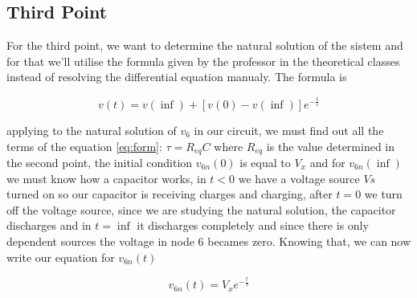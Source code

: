 \vspace{5mm}
\begin{table}[H]
\centering
\begin{tabularx}{0.6\textwidth} {
  | >{\raggedright\arraybackslash}X
  | >{\raggedleft\arraybackslash}X | }
 \hline

\end{tabularx}
\end{table}

\vspace{5mm}
\begin{table}[H]
\centering
\begin{tabularx}{0.6\textwidth} {
  | >{\raggedright\arraybackslash}X
  | >{\raggedleft\arraybackslash}X | }
 \hline

\end{tabularx}
\end{table}
\vspace{5mm}

\subsection{Third Point}
\label{ssec:3T}

\noindent \par For the third point, we want to determine the natural solution of the sistem and for that we'll utilise the formula given by the professor in the theoretical classes instead of resolving the differential equation manualy. The formula is 

\begin{equation}
  v(t) = v(\inf) + [v(0) - v(\inf)]e^{-\frac{t}{\tau}}
  \label{eq:form}
\end{equation}

applying to the natural solution of $v_6$ in our circuit, we must find out all the terms of the equation \ref{eq:form}: $\tau=R_{eq}C$ where $R_{eq}$ is the value determined in the second point, the initial condition $v_{6n}(0)$ is equal to $V_x$ and for $v_{6n}(\inf)$ we must know how a capacitor works, in $t<0$ we have a voltage source $Vs$ turned on so our capacitor is receiving charges and charging, after $t=0$ we turn off the voltage source, since we are studying the natural solution, the capacitor discharges and in $t=\inf$ it discharges completely and since there is only dependent sources the voltage in node 6 becames zero. Knowing that, we can now write our equation for $v_{6n}(t)$

\begin{equation}
  v_{6n}(t) = V_x e^{-\frac{t}{\tau}}
  \label{eq:snat}
\end{equation}

